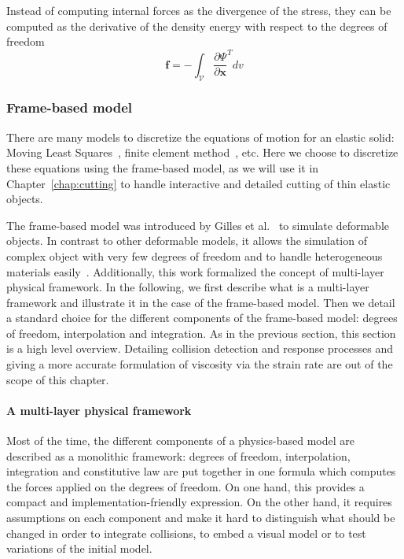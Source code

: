 Instead of computing internal forces as the divergence of the stress, they can be computed as the derivative of the density energy with respect to the degrees of freedom
\begin{equation}
\label{eq:internalForces_solids}
\mathbf{f} = -\int_{\mathcal{V}} \frac{\partial \Psi}{\partial \mathbf{x}}^{T} dv
\end{equation}

\subsubsection{Frame-based model}
\label{subsubsec:framebased}
There are many models to discretize the equations of motion for an elastic solid: Moving Least Squares~\cite{Muller2004:melting}, finite element method~\cite{OBrien1999}, etc.
Here we choose to discretize these equations using the frame-based model, as we will use it in Chapter~\ref{chap:cutting} to handle interactive and detailed cutting of thin elastic objects.

The frame-based model was introduced by Gilles et al.~\cite{Gilles2011} to simulate deformable objects. 
In contrast to other deformable models, it allows the simulation of complex object with very few degrees of freedom and to handle heterogeneous materials easily~\cite{Faure2011}. 
Additionally, this work formalized the concept of multi-layer physical framework. 
In the following, we first describe what is a multi-layer framework and illustrate it in the case of the frame-based model. 
Then we detail a standard choice for the different components of the frame-based model: degrees of freedom, interpolation and integration. 
As in the previous section, this section is a high level overview. 
Detailing collision detection and response processes and giving a more accurate formulation of viscosity via the strain rate are out of the scope of this chapter.

\paragraph{A multi-layer physical framework}
Most of the time, the different components of a physics-based model are described as a monolithic framework: degrees of freedom, interpolation, integration and constitutive law are put together in one formula which computes the forces applied on the degrees of freedom. On one hand, this provides a compact and implementation-friendly expression. 
On the other hand, it requires assumptions on each component and make it hard to distinguish what should be changed in order to integrate collisions, to embed a visual model or to test variations of the initial model.

